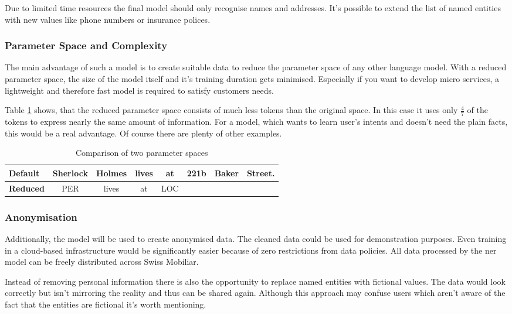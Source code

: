 Due to limited time resources the final model should only recognise names and addresses. It's possible to extend the list of named
entities with new values like phone numbers or insurance polices.

\subsubsection{Parameter Space and Complexity}

The main advantage of such a model is to create suitable data to reduce the parameter space of any other language model. With a
reduced parameter space, the size of the model itself and it's training duration gets minimised. Especially if you want to develop
micro services, a lightweight and therefore fast model is required to satisfy customers needs.

Table \ref{tbl:param-space} shows, that the reduced parameter space consists of much less tokens than the original space. In this
case it uses only $\frac{4}{7}$ of the tokens to express nearly the same amount of information. For a model, which wants to learn
user's intents and doesn't need the plain facts, this would be a real advantage. Of course there are plenty of other examples.

\begin{table}[h!]
    \centering
    \begin{tabular}{|l|c|c|c|c|c|c|c|}
        \hline
        \textbf{Default} & Sherlock & Holmes & lives & at & 221b & Baker & Street. \\
        \hline
        \textbf{Reduced} & PER & lives & at & LOC & & & \\
        \hline
    \end{tabular}
    \caption{Comparison of two parameter spaces}
    \label{tbl:param-space}
\end{table}

\subsubsection{Anonymisation}

Additionally, the model will be used to create anonymised data. The cleaned data could be used for demonstration purposes. Even
training in a cloud-based infrastructure would be significantly easier because of zero restrictions from data policies. All data
processed by the \acrshort{ner} model can be freely distributed across Swiss Mobiliar.

Instead of removing personal information there is also the opportunity to replace named entities with fictional values. The data
would look correctly but isn't mirroring the reality and thus can be shared again. Although this approach may confuse users which
aren't aware of the fact that the entities are fictional it's worth mentioning.

